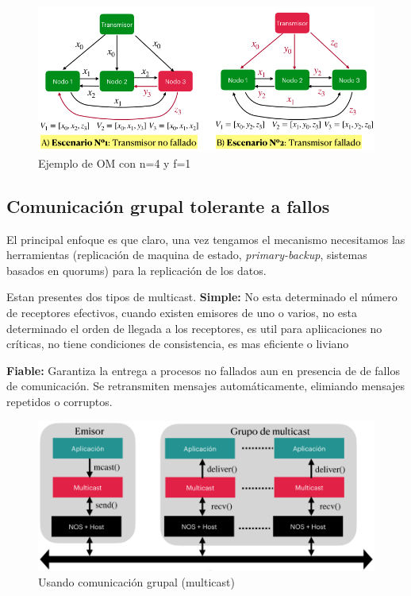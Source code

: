 \begin{figure}[H]
    \centering
    \includegraphics[width=1.0\linewidth]{img/ordinario.png}
    \caption{Ejemplo de OM con n=4 y f=1}\label{fig:1761838884075}
\end{figure}

\subsection{Comunicación grupal tolerante a fallos}
El principal enfoque es que claro, una vez tengamos el mecanismo necesitamos las herramientas (replicación de maquina de estado, \textit{primary-backup}, sistemas basados en quorums) para la replicación de los datos.

Estan presentes dos tipos de multicast.
\textbf{Simple:}  No esta determinado el número de receptores efectivos, cuando existen emisores de uno o varios, no esta determinado el orden de llegada a los receptores, es util para apliicaciones no críticas, no tiene condiciones de consistencia, es mas eficiente o liviano

\textbf{Fiable:} Garantiza la entrega a procesos no fallados aun en presencia de de fallos de comunicación. Se retransmiten mensajes automáticamente, elimiando mensajes repetidos o corruptos.

\begin{figure}[H]
    \centering
    \includegraphics[width=1.0\linewidth]{img/Multicast_grupal.png}
    \caption{Usando comunicación grupal (multicast)}\label{fig:1761651184845}
\end{figure}
